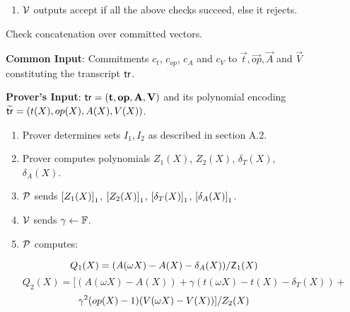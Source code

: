 \begin{figure}[htbp]
\begin{mdframed}
{\begin{enumerate}[leftmargin=1em, label=\arabic*.]
\begin{itemize}[leftmargin=1em]
					\item $\kzgverify(\srs,\gone{f},  \val{s}{Z} + r\val{s}{Q}, s,\Pi_f)$.
					\item $\val{s}{Q}\cdot \val{s}{Z} = \val{s^3}{h}-\val{s}{v}-\gamma \val{\omega^m s}{v}-\gamma^2\val{\omega^{2m}s}{v}$.
				\end{itemize}
				\item $\mathcal{V}$ outputs accept if all the above checks succeed, else it rejects.
			\end{enumerate}
		}
	\end{mdframed}
	\caption{Check concatenation over committed vectors.}
	\label{fig:concatenation}
\end{figure}

\begin{figure}[htbp]

    \begin{mdframed}
    {
            {\bf Common Input}: Commitments $c_t$, $c_{op}$, $c_A$ and $c_V$ to $\vec{t},\vec{op},\vec{A}$ and $\vec{V}$ constituting the transcript $\mathsf{tr}$.

            {\bf Prover's Input}: $\mathsf{tr}=(\mathbf{t}, \mathbf{op}, \mathbf{A}, \mathbf{V})$ and its polynomial encoding $\widetilde{\mathsf{tr}}=(t(X), {op}(X), A(X), V(X))$.
        \begin{enumerate}[leftmargin=1em, label=\arabic*]
            \item Prover determines sets $I_1, I_2$ as described in section A.2.
            \item Prover computes polynomials $Z_1(X)$, $Z_2(X)$, $\delta_T(X)$, $\delta_A(X)$.
            \item $\mathcal{P}$ sends $\left[{Z_1(X)}\right]_1$, $\left[{Z_2(X)}\right]_1$, $\left[{\delta_T(X)}\right]_1$, $\left[{\delta_A(X)}\right]_1$.
            \item $\mathcal{V}$ sends $\gamma\gets \mathbb{F}$.
            \item $\mathcal{P}$ computes:

            $$Q_1(X) =  (A(\omega X) - A(X) - \delta_A(X)) / \mathsf{Z}_1(X)$$
            $$Q_2(X) =  [(A(\omega X) - A(X))+\gamma(t(\omega X) - t(X) - \delta_T(X))+$$
            $$ \gamma^2 ({op}(X) - 1)(V(\omega X) - V(X))] / Z_2(X) $$



\end{enumerate}}
\end{mdframed}
\end{figure}
